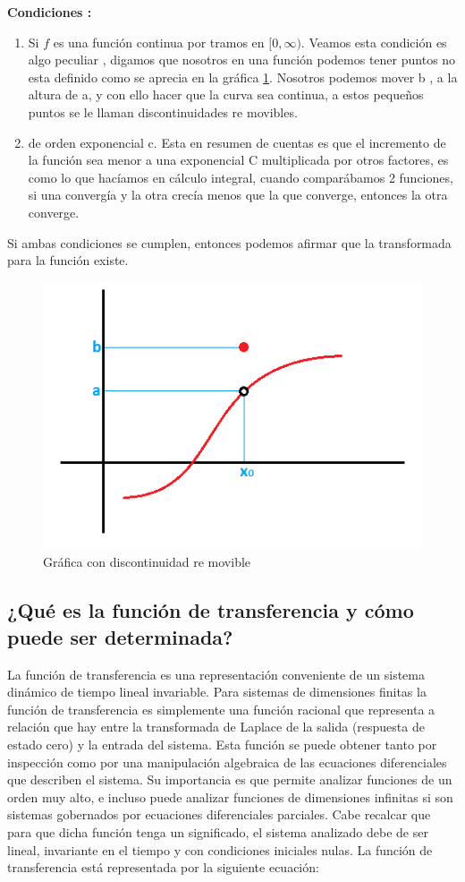 \textbf{Condiciones :}
\begin{enumerate}
	\item Si $ f  $ es una función continua por tramos en $ [0, \infty) $.
	\subitem Veamos esta condición es algo peculiar , digamos  que nosotros en una función podemos tener puntos no esta definido como se aprecia en la gráfica \ref{fig:ilustracion1}. Nosotros podemos mover b , a la altura de a, y con ello hacer que la curva sea continua, a estos pequeños puntos se le llaman discontinuidades re movibles.
	\item  de orden exponencial c.
	\subitem Esta en resumen de cuentas es que el incremento de la función sea menor a una exponencial C multiplicada por otros factores, es como lo que hacíamos en cálculo integral, cuando comparábamos 2 funciones, si una convergía y la otra crecía menos que la que converge, entonces la otra converge.
\end{enumerate}

Si ambas condiciones se cumplen, entonces podemos afirmar que la transformada para la función existe.

\begin{figure}[h]
	\centering
	\includegraphics[width=0.7\linewidth]{img/ilustracion_1}
	\caption{Gráfica con discontinuidad re movible}
	\label{fig:ilustracion1}
\end{figure}


\subsection{¿Qué es la función de transferencia y cómo puede ser determinada?}	
La función de transferencia es una representación conveniente de un sistema dinámico de tiempo lineal invariable. Para sistemas de dimensiones finitas la función de transferencia es simplemente una función racional que representa a relación que hay entre la transformada de Laplace de la salida (respuesta de estado cero) y la entrada del sistema. Esta función se puede obtener tanto por inspección como por una manipulación algebraica de las ecuaciones diferenciales que describen el sistema. Su importancia es que permite analizar funciones de un orden muy alto, e incluso puede analizar funciones de dimensiones infinitas si son sistemas gobernados por ecuaciones diferenciales parciales. Cabe recalcar que para que dicha función tenga un significado, el sistema analizado debe de ser lineal, invariante en el tiempo y con condiciones iniciales nulas. La función de transferencia está representada por la siguiente ecuación:

